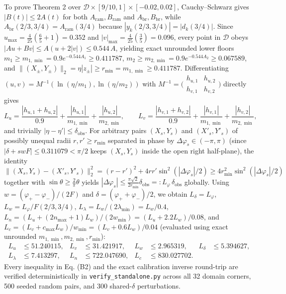 \documentclass[11pt,letterpaper]{article}
\theoremstyle{definition}
\begin{document}
To prove Theorem 2 over
\(\mathcal{D} \times [9/10, 1] \times [-0.02, 0.02]\), Cauchy--Schwarz
gives \(|B(t)| \le 2 A(t)\) for both
\(A_{\mathrm{ram}}, B_{\mathrm{ram}}\) and
\(A_{\mathrm{br}}, B_{\mathrm{br}}\), while
\(A_{\mathrm{br}}(2/3, 3/4) = A_{\mathrm{ram}}(3/4)\) because
\(|y_k(2/3,3/4)| = |d_k(3/4)|\). Since
\(u_{\max} = \frac{4}{25}(\frac{6}{5} + 1) = 0.352\) and
\(|v|_{\max} = \frac{4}{25}(\frac{3}{5}) = 0.096\), every point in
\(\mathcal{D}\) obeys \(|A u + B v| \le A(u + 2|v|) \le 0.544\,A\),
yielding exact unrounded lower floors
\(m_1 \ge m_{1,\min} = 0.9 e^{-0.544 A_1} \ge 0.411787\),
\(m_2 \ge m_{2,\min} = 0.9 e^{-0.544 A_2} \ge 0.067589\), and
\(\|(X_\pm, Y_\pm)\|_2 = \eta|z_\pm| \ge r_{\min} = m_{1,\min} \ge 0.411787\).
Differentiating \((u, v) = M^{-1}(\ln(\eta/m_1), \ln(\eta/m_2))\) with
\(M^{-1} = \bigl(\begin{smallmatrix} h_{u,1} & h_{u,2} \\ h_{v,1} & h_{v,2} \end{smallmatrix}\bigr)\)
directly gives
\[L_u = \frac{|h_{u,1} + h_{u,2}|}{0.9} + \frac{|h_{u,1}|}{m_{1,\min}} + \frac{|h_{u,2}|}{m_{2,\min}}, \qquad L_v = \frac{|h_{v,1} + h_{v,2}|}{0.9} + \frac{|h_{v,1}|}{m_{1,\min}} + \frac{|h_{v,2}|}{m_{2,\min}},\]
and trivially \(|\eta - \eta'| \le \delta_{\mathrm{obs}}\). For
arbitrary pairs \((X_s, Y_s)\) and \((X'_s, Y'_s)\) of possibly unequal
radii \(r, r' \ge r_{\min}\) separated in phase by
\(\Delta\varphi_s \in (-\pi, \pi)\) (since
\(|\delta + swF| \le 0.311079 < \pi/2\) keeps \((X_s, Y_s)\) inside the
open right half-plane), the identity
\(\|(X_s,Y_s)-(X'_s,Y'_s)\|_2^2 = (r - r')^2 + 4rr'\sin^2(|\Delta\varphi_s|/2) \ge 4 r_{\min}^2 \sin^2(|\Delta\varphi_s|/2)\)
together with \(\sin\theta \ge \frac{2}{\pi}\theta\) yields
\(|\Delta\varphi_s| \le \frac{\pi\sqrt{2}}{2 r_{\min}}\delta_{\mathrm{obs}} =: L_\varphi\,\delta_{\mathrm{obs}}\)
globally. Using \(w = (\varphi_+ - \varphi_-)/(2F)\) and
\(\delta = (\varphi_+ + \varphi_-)/2\), we obtain
\(L_\delta = L_\varphi\), \(L_w = L_\varphi/F(2/3, 3/4)\),
\(L_\lambda = L_w/(2\lambda_{\min}) = L_w/0.4\),
\(L_n = (L_u + (2n_{\max}+1)L_w)/(2 w_{\min}) = (L_u + 2.2 L_w)/0.08\),
and \(L_c = (L_v + c_{\max} L_w)/w_{\min} = (L_v + 0.6 L_w)/0.04\)
(evaluated using exact unrounded \(m_{1,\min}, m_{2,\min}, r_{\min}\)):
\[\begin{aligned}
L_u &\le 51.240115, & L_v &\le 31.421917, & L_w &\le 2.965319, & L_\delta &\le 5.394627, \\
L_\lambda &\le 7.413297, & L_n &\le 722.047690, & L_c &\le 830.027702. & &
\end{aligned}
\tag{B2}\] Every inequality in Eq. (B2) and the exact calibration
inverse round-trip are verified deterministically in
\texttt{verify\_standalone.py} across all 32 domain corners, 500 seeded
random pairs, and 300 shared-\(\delta\) perturbations.
\end{document}
